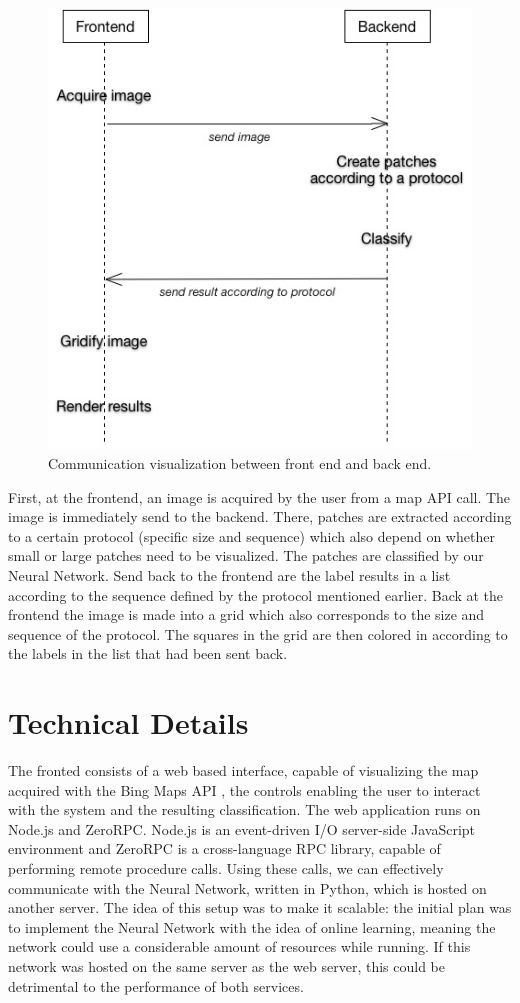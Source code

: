 \documentclass[a4paper,onecolumn]{report}
\begin{document}
\begin{figure}[h!]
    \centering
    \includegraphics[scale=0.5]{./images/communication2.jpg}
    \caption{Communication visualization between front end and back end.}
	\label{fig:communication}
\end{figure}
\noindent
First, at the frontend, an image is acquired by the user from a map API call. The image is immediately send to the backend. There, patches are extracted according to a certain protocol (specific size and sequence) which also depend on whether small or large patches need to be visualized. The patches are classified by our Neural Network. Send back to the frontend are the label results in a list according to the sequence defined by the protocol mentioned earlier. Back at the frontend the image is made into a grid which also corresponds to the size and sequence of the protocol. The squares in the grid are then colored in according to the labels in the list that had been sent back.

\section{Technical Details}
The fronted consists of a web based interface, capable of visualizing the map acquired with the Bing Maps API \cite{bing}, the controls enabling the user to interact with the system and the resulting classification. The web application runs on Node.js and ZeroRPC. Node.js is an event-driven I/O server-side JavaScript environment and ZeroRPC is a cross-language RPC library, capable of performing remote procedure calls. Using these calls, we can effectively communicate with the Neural Network, written in Python, which is hosted on another server. The idea of this setup was to make it scalable: the initial plan was to implement the Neural Network with the idea of online learning, meaning the network could use a considerable amount of resources while running. If this network was hosted on the same server as the web server, this could be detrimental to the performance of both services.
\end{document}
